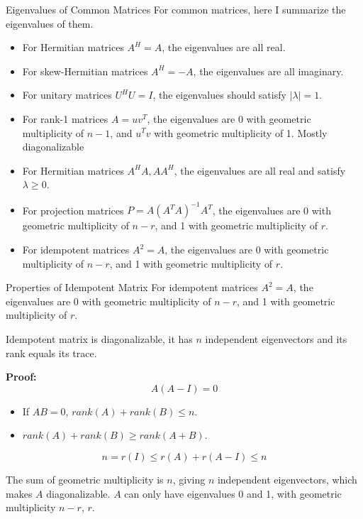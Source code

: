 \documentclass{beamer}
\begin{document}
\begin{frame}{Eigenvalues of Common Matrices}
For common matrices, here I summarize the eigenvalues of them.
\begin{itemize}
    \item For Hermitian matrices $A^H=A$, the eigenvalues are all real.
    \item For skew-Hermitian matrices $A^H=-A$, the eigenvalues are all imaginary.
    \item For unitary matrices $U^HU=I$, the eigenvalues should satisfy $|\lambda|=1$.
    \item For rank-1 matrices $A=uv^T$, the eigenvalues are 0 with geometric multiplicity of $n-1$, and $u^Tv$ with geometric multiplicity of 1. Mostly diagonalizable
    \item For Hermitian matrices $A^HA, AA^H$, the eigenvalues are all real and satisfy $\lambda \geq 0$.
    \item For projection matrices $P=A(A^TA)^{-1}A^T$, the eigenvalues are 0 with geometric multiplicity of $n-r$, and 1 with geometric multiplicity of $r$.
    \item For idempotent matrices $A^2=A$, the eigenvalues are 0 with geometric multiplicity of $n-r$, and 1 with geometric multiplicity of $r$.
\end{itemize}
\end{frame}

\begin{frame}{Properties of Idempotent Matrix}
For idempotent matrices $A^2=A$, the eigenvalues are 0 with geometric multiplicity of $n-r$, and 1 with geometric multiplicity of $r$.

\vspace{3pt}
Idempotent matrix is diagonalizable, it has $n$ independent eigenvectors and its rank equals its trace.

\vspace{5pt}

\textbf{Proof:}
\begin{equation*}
    A\left( A-I \right) =0
\end{equation*}

\begin{itemize}
    \item If $AB=0$, $rank(A)+rank(B)\leq n$.
    \item $rank(A)+rank(B)\geq  rank(A+B)$.
\end{itemize}

\begin{equation*}
    n=r\left( I \right) \leqslant r\left( A \right) +r\left( A-I \right) \leqslant n
\end{equation*}

The sum of geometric multiplicity is $n$, giving $n$ independent eigenvectors, which makes $A$ diagonalizable. $A$ can only have eigenvalues 0 and 1, with geometric multiplicity $n-r$, $r$.
\end{frame}
\end{document}
